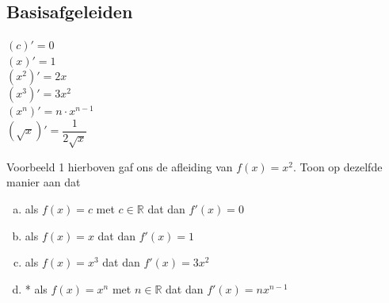 \documentclass[a4paper,12pt,twoside]{article}
\newenvironment{kader}{
  \begin{mdframed}[nobreak=true]
  }{%
  \end{mdframed}
}
\begin{document}
\subsection{Basisafgeleiden}

\begin{kader}
  \begin{multicols}{3}
    $\left(c\right)'=0$\\
    $\left(x\right)'=1$\\
    $\left(x^2\right)'=2x$\\
    $\left(x^3\right)'=3x^2$\\
    $\left(x^n\right)'=n\cdot x^{n-1}$\\
    $\left(\sqrt{x}\right)'=\dfrac{1}{2\sqrt{x}}$\\
  \end{multicols}
\end{kader}

\begin{oefening}
  Voorbeeld 1 hierboven gaf ons de afleiding van $f(x)=x^2$. Toon op dezelfde manier aan dat
  \begin{enumerate}[(a)]
    \itemsep.5em
  \item als $f(x)=c$ met $c \in \mathbb{R}$ dat dan $f'(x)=0$
  \item als $f(x)=x$ dat dan $f'(x)=1$
  \item als $f(x)=x^3$ dat dan $f'(x)=3x^2$
  \item* als $f(x)=x^n$ met $n\in \mathbb{R}$ dat dan $f'(x)=nx^{n-1}$
\end{enumerate}
\end{oefening}
\end{document}
